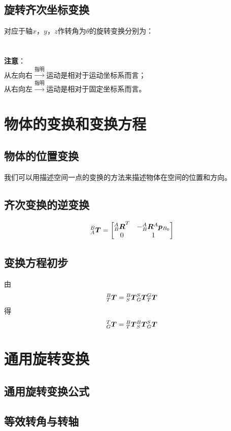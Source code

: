 \subsection{旋转齐次坐标变换}
对应于轴$x$，$y$，$z$作转角为$\theta$的旋转变换分别为：
\Rotx\\
\Roty\\
\Rotz\\
\flushleft\textbf{注意}：\\
从左向右$\xrightarrow{指明}$运动是相对于运动坐标系而言；\\
从右向左$\xrightarrow{指明}$运动是相对于固定坐标系而言。
\section{物体的变换和变换方程}
\subsection{物体的位置变换}
我们可以用描述空间一点的变换的方法来描述物体在空间的位置和方向。
\subsection{齐次变换的逆变换}
\begin{equation}
\zb{T}{B}{A}=
\begin{bmatrix}
{\zb{R}{A}{B}}^T & -\zb{R}{A}{B}\djb{p}{A}{B_0}\\
0 & 1
\end{bmatrix}
\end{equation}
\subsection{变换方程初步}
由
\begin{equation}
\zb{T}{B}{T}=\zb{T}{B}{S}\zb{T}{S}{G}\zb{T}{G}{T}
\end{equation}
得
\begin{equation}
\zb{T}{T}{G}=\zb{T}{B}{T}\zb{T}{B}{S}\zb{T}{S}{G}
\end{equation}
\section{通用旋转变换}
\subsection{通用旋转变换公式}
\subsection{等效转角与转轴}
